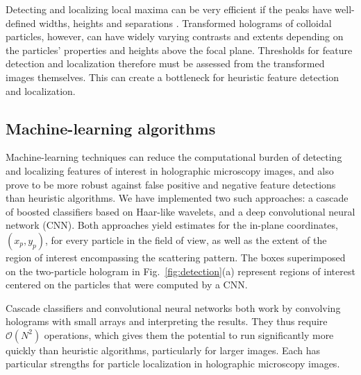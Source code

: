 Detecting and localizing local maxima can be very
efficient if the peaks have well-defined widths,
heights and separations \cite{crocker96,allan16trackpy}.
Transformed holograms of colloidal particles, however,
can have widely varying contrasts
and extents depending on the particles' properties and
heights above the focal plane.
Thresholds for feature detection and localization therefore
must be assessed from the transformed images
themselves.
This can create a bottleneck
for
heuristic feature detection and localization.

\subsection{Machine-learning algorithms}

Machine-learning techniques can reduce the computational
burden of detecting and localizing features of interest in
holographic microscopy images, and also prove to be more
robust against false positive and negative feature detections
than heuristic algorithms.
We have implemented two such approaches:
a cascade of boosted classifiers based on Haar-like wavelets,
and a deep convolutional neural network (CNN).
Both approaches yield estimates for the in-plane
coordinates, $(x_p, y_p)$, for every particle in the field
of view, as well as the extent of the region of interest
encompassing the scattering pattern.
The boxes superimposed on the two-particle hologram in
Fig.~\ref{fig:detection}(a) represent
regions of interest centered on the particles
that were computed by a CNN.

Cascade classifiers and convolutional neural networks
both work by convolving holograms with
small arrays and interpreting the results.
They thus require $\mathcal{O}\left ( N^2 \right )$ operations, which 
gives them the potential to run significantly more
quickly than heuristic algorithms, particularly for
larger images.
Each has particular strengths for particle localization
in holographic microscopy images.

